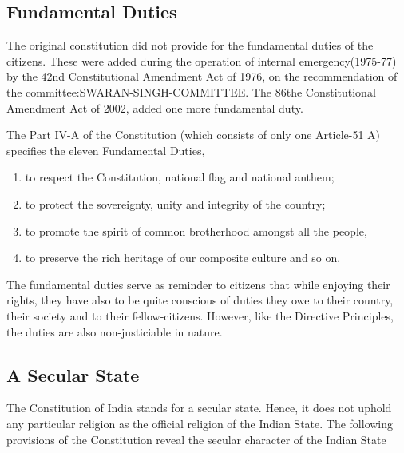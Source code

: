 \subsection{Fundamental Duties}

The original constitution did not provide for the fundamental duties of the citizens. These were added during the operation of internal emergency(1975-77) by the 42nd Constitutional Amendment Act of 1976, on the recommendation of the \gls{committee:SWARAN-SINGH-COMMITTEE}. The 86the Constitutional Amendment Act of 2002, added one more fundamental duty.

The Part IV-A of the Constitution (which consists of only one Article-51 A) specifies the eleven Fundamental Duties,

\renewcommand{\labelenumi}{\textbf{(\alph{enumi})}}
\begin{enumerate}
  \item to respect the Constitution, national flag and national anthem;
  \item to protect the sovereignty, unity and integrity of the country;
  \item to promote the spirit of common brotherhood amongst all the people,
  \item to preserve the rich heritage of our composite culture and so on.
\end{enumerate}

The fundamental duties serve as reminder to citizens that while enjoying their rights, they have also to be quite conscious of duties they owe to their country, their society and to their fellow-citizens. However, like the Directive Principles, the duties are also non-justiciable in nature.


\subsection{A Secular State}

The Constitution of India stands for a secular state. Hence, it does not uphold any particular religion as the official religion of the Indian State. The following provisions of the Constitution reveal the secular character of the Indian State


